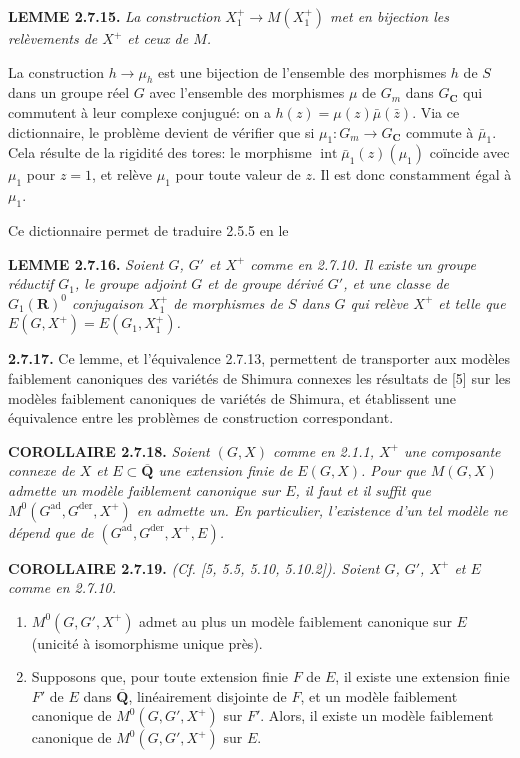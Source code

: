 \documentclass[10pt,a4paper]{article}
\begin{document}
\textbf{LEMME 2.7.15.} \emph{La construction \(X_1^+\to M(X_1^+)\) met en bijection les relèvements de \(X^+\) et ceux de \(M\).}

La construction \(h\to\mu_h\) est une bijection de l'ensemble des morphismes \(h\) de \(S\) dans un groupe réel \(G\) avec l'ensemble des morphismes \(\mu\) de \(G_m\) dans \(G_{\mathbf C}\) qui commutent à leur complexe conjugué: on a \(h(z)=\mu(z)\bar\mu(\bar z)\). Via ce dictionnaire, le problème devient de vérifier que si \(\mu_1:G_m\to G_{\mathbf C}\) commute à \(\bar\mu_1\). Cela résulte de la rigidité des tores: le morphisme \(\operatorname{int}\bar\mu_1(z)(\mu_1)\) coïncide avec \(\mu_1\) pour \(z=1\), et relève \(\mu_1\) pour toute valeur de \(z\). Il est donc constamment égal à \(\mu_1\).

Ce dictionnaire permet de traduire 2.5.5 en le

\textbf{LEMME 2.7.16.} \emph{Soient \(G\), \(G'\) et \(X^+\) comme en 2.7.10. Il existe un groupe réductif \(G_1\), le groupe adjoint \(G\) et de groupe dérivé \(G'\), et une classe de \(G_1(\mathbf R)^0\) conjugaison \(X_1^+\) de morphismes de \(S\) dans \(G\) qui relève \(X^+\) et telle que \(E(G,X^+)=E(G_1,X_1^+)\).}

\textbf{2.7.17.} Ce lemme, et l'équivalence 2.7.13, permettent de transporter aux modèles faiblement canoniques des variétés de Shimura connexes les résultats de {[}5{]} sur les modèles faiblement canoniques de variétés de Shimura, et établissent une équivalence entre les problèmes de construction correspondant.

\textbf{COROLLAIRE 2.7.18.} \emph{Soient \((G,X)\) comme en 2.1.1, \(X^+\) une composante connexe de \(X\) et \(E\subset\overline{\mathbf Q}\) une extension finie de \(E(G,X)\). Pour que \(M(G,X)\) admette un modèle faiblement canonique sur \(E\), il faut et il suffit que \(M^0(G^{\mathrm{ad}},G^{\mathrm{der}},X^+)\) en admette un. En particulier, l'existence d'un tel modèle ne dépend que de \((G^{\mathrm{ad}},G^{\mathrm{der}},X^+,E)\).}

\textbf{COROLLAIRE 2.7.19.} \emph{(Cf. {[}5, 5.5, 5.10, 5.10.2{]}). Soient \(G\), \(G'\), \(X^+\) et \(E\) comme en 2.7.10.}

\begin{enumerate}
\def\labelenumi{(\roman{enumi})}
\item
  \(M^0(G,G',X^+)\) admet au plus un modèle faiblement canonique sur \(E\) (unicité à isomorphisme unique près).
\item
  Supposons que, pour toute extension finie \(F\) de \(E\), il existe une extension finie \(F'\) de \(E\) dans \(\overline{\mathbf Q}\), linéairement disjointe de \(F\), et un modèle faiblement canonique de \(M^0(G,G',X^+)\) sur \(F'\). Alors, il existe un modèle faiblement canonique de \(M^0(G,G',X^+)\) sur \(E\).
\end{enumerate}
\end{document}
